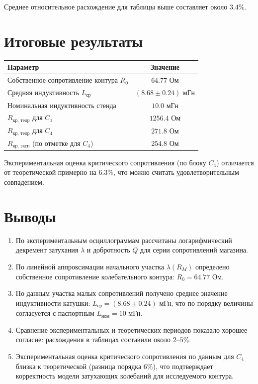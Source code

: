 \documentclass[a4paper,14pt]{article}
\begin{document}
Среднее относительное расхождение для таблицы выше составляет около $3.4\%$.


\section{Итоговые результаты}

\begin{table}[H]
\centering
\small
\begin{tabular}{|l|c|}
\hline
Параметр & Значение \\
\hline
Собственное сопротивление контура $R_0$ & $64.77$ Ом \\
Средняя индуктивность $L_{\text{ср}}$ & $(8.68 \pm 0.24)$ мГн \\
Номинальная индуктивность стенда & $10.0$ мГн \\
$R_{\text{кр, теор}}$ для $C_1$ & $1256.4$ Ом \\
$R_{\text{кр, теор}}$ для $C_4$ & $271.8$ Ом \\
$R_{\text{кр, эксп}}$ (по отметке для $C_4$) & $254.8$ Ом \\
\hline
\end{tabular}
\end{table}

Экспериментальная оценка критического сопротивления (по блоку $C_4$) отличается от теоретической примерно на $6.3\%$, что можно считать удовлетворительным совпадением.

\section{Выводы}

\begin{enumerate}
    \item По экспериментальным осциллограммам рассчитаны логарифмический декремент затухания $\lambda$ и добротность $Q$ для серии сопротивлений магазина.

    \item По линейной аппроксимации начального участка $\lambda(R_M)$ определено собственное сопротивление колебательного контура: $R_0=64.77$ Ом.

    \item По данным участка малых сопротивлений получено среднее значение индуктивности катушки: $L_{\text{ср}}=(8.68\pm0.24)$ мГн, что по порядку величины согласуется с паспортным $L_{\text{ном}}=10$ мГн.

    \item Сравнение экспериментальных и теоретических периодов показало хорошее согласие: расхождения в таблицах составили около $2$--$5\%$.

    \item Экспериментальная оценка критического сопротивления по данным для $C_4$ близка к теоретической (разница порядка $6\%$), что подтверждает корректность модели затухающих колебаний для исследуемого контура.
\end{enumerate}
\end{document}
